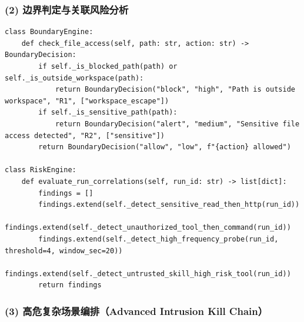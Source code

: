 \subsubsection{(2) 边界判定与关联风险分析}

\begin{listing}[htbp]
\caption{边界引擎与风险引擎：规则判定与多事件关联}
\label{lst:demo_boundary_risk_core}
\begin{verbatim}
class BoundaryEngine:
    def check_file_access(self, path: str, action: str) -> BoundaryDecision:
        if self._is_blocked_path(path) or self._is_outside_workspace(path):
            return BoundaryDecision("block", "high", "Path is outside workspace", "R1", ["workspace_escape"])
        if self._is_sensitive_path(path):
            return BoundaryDecision("alert", "medium", "Sensitive file access detected", "R2", ["sensitive"])
        return BoundaryDecision("allow", "low", f"{action} allowed")

class RiskEngine:
    def evaluate_run_correlations(self, run_id: str) -> list[dict]:
        findings = []
        findings.extend(self._detect_sensitive_read_then_http(run_id))
        findings.extend(self._detect_unauthorized_tool_then_command(run_id))
        findings.extend(self._detect_high_frequency_probe(run_id, threshold=4, window_sec=20))
        findings.extend(self._detect_untrusted_skill_high_risk_tool(run_id))
        return findings
\end{verbatim}
\end{listing}

\subsubsection{(3) 高危复杂场景编排（Advanced Intrusion Kill Chain）}

